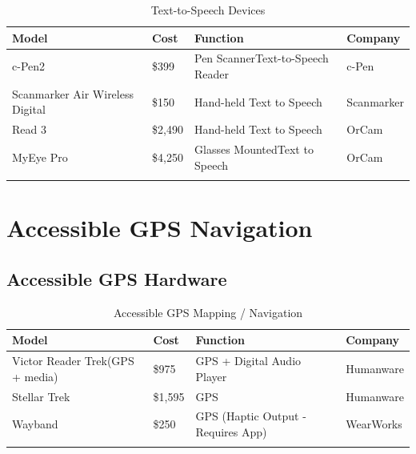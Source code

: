 \documentclass[14pt, letterpaper,twoside]{extreport}
\begin{document}
\begin{longtable}[]{@{}
	>{\raggedright\arraybackslash}p{}
	>{\raggedright\arraybackslash}p{}
	>{\raggedright\arraybackslash}p{}
	>{\raggedright\arraybackslash}p{}@{}
	}
	\toprule\noalign{}

	\textbf{Model}                  & \textbf{Cost} & \textbf{Function}                       & \textbf{Company} \\
	\midrule\noalign{}
	\endhead
	\bottomrule\noalign{}
	\endlastfoot
	c-Pen2                          & \$399         & Pen Scanner\break Text-to-Speech Reader & c-Pen            \\[1.0em]
	Scanmarker Air Wireless Digital & \$150         & Hand-held Text to Speech                & Scanmarker       \\[1.0em]
	Read 3                          & \$2,490       & Hand-held Text to Speech                & OrCam            \\[1.0em]
	MyEye Pro                       & \$4,250       & Glasses Mounted\break Text to Speech    & OrCam            \\[1.0em]\hline
	\caption{ Text-to-Speech Devices}
\end{longtable}


\hypertarget{accessible-gps-mapping}{%
	\pagebreak \chapter*{Accessible GPS Navigation}\label{accessible-gps-mapping}}

\hypertarget{accessible-gps-mapping-hardware}{%
	\section*{Accessible GPS Hardware}\label{accessible-gps-mapping-hardware}}

\begin{longtable}[]{@{}
	>{\raggedright\arraybackslash}p{}
	>{\raggedright\arraybackslash}p{}
	>{\raggedright\arraybackslash}p{}
	>{\raggedright\arraybackslash}p{}@{}
	}
	\toprule\noalign{}

	\textbf{Model}                  & \textbf{Cost} & \textbf{Function}                  & \textbf{Company} \\
	\midrule\noalign{}
	\endhead
	\bottomrule\noalign{}
	\endlastfoot
	Victor Reader Trek(GPS + media) & \$975         & GPS + Digital Audio Player         & Humanware        \\[1.5em]
	Stellar Trek                    & \$1,595       & GPS                                & Humanware        \\[1.5em]
	Wayband                         & \$250         & GPS (Haptic Output - Requires App) & WearWorks         \\[1.5em]\hline
	\caption{ Accessible GPS Mapping / Navigation }
\end{longtable}
\end{document}
